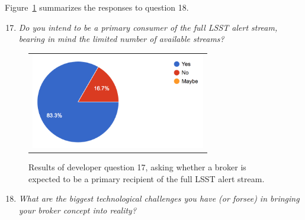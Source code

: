 \documentclass{article}
\begin{document}
Figure~\ref{fig:alert_streams} summarizes the responses to question 18. 

\begin{enumerate}
\setcounter{enumi}{16}
\item {\em Do you intend to be a primary consumer of the full LSST alert stream, bearing in mind the limited number of available streams?}
\end{enumerate}

\begin{figure}[ht]
\centering
\begin{tabular}{c}
\includegraphics[width=3in]{figures/developer_question_17.png}
\end{tabular}
\caption{Results of developer question 17, asking whether a broker is expected to be a primary recipient of the full LSST alert stream.}
\label{fig:alert_streams}
\end{figure}

\begin{enumerate}
\setcounter{enumi}{17}
\item {\em What are the biggest technological challenges you have (or forsee) in bringing your broker concept into reality?}
\end{enumerate}
\end{document}
